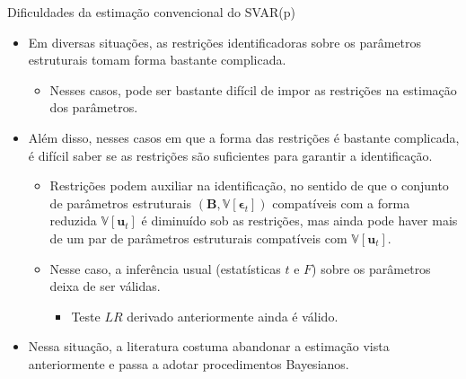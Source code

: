 \documentclass[11pt]{beamer}
\begin{document}
\begin{frame}{Dificuldades da estimação convencional do SVAR(p)}
\begin{itemize}
	\item Em diversas situações, as restrições identificadoras sobre os parâmetros estruturais tomam forma bastante complicada.
	\begin{itemize}
		\item Nesses casos, pode ser bastante difícil de impor as restrições na estimação dos parâmetros.
	\end{itemize}
	\item Além disso, nesses casos em que a forma das restrições é bastante complicada, é difícil saber se as restrições são suficientes para garantir a identificação.
	\begin{itemize}
		\item Restrições podem {\color{blue}auxiliar na identificação}, no sentido de que o conjunto de parâmetros estruturais $(\boldsymbol{B}, \mathbb{V}[\boldsymbol{\epsilon}_t])$ compatíveis com a forma reduzida $\mathbb{V}[\boldsymbol{u}_t]$ é diminuído sob as restrições, mas ainda pode haver mais de um par de parâmetros estruturais compatíveis com  $\mathbb{V}[\boldsymbol{u}_t]$.
		\item Nesse caso, a inferência usual (estatísticas $t$ e $F$) {\color{blue}sobre os parâmetros} deixa de ser válidas.
		\begin{itemize}
			\item Teste $LR$ derivado anteriormente ainda é válido.
		\end{itemize}
	\end{itemize}
	\item Nessa situação, a literatura costuma abandonar a estimação vista anteriormente e passa a adotar {\color{blue}procedimentos Bayesianos}.

\end{itemize}
\end{frame}
\end{document}
